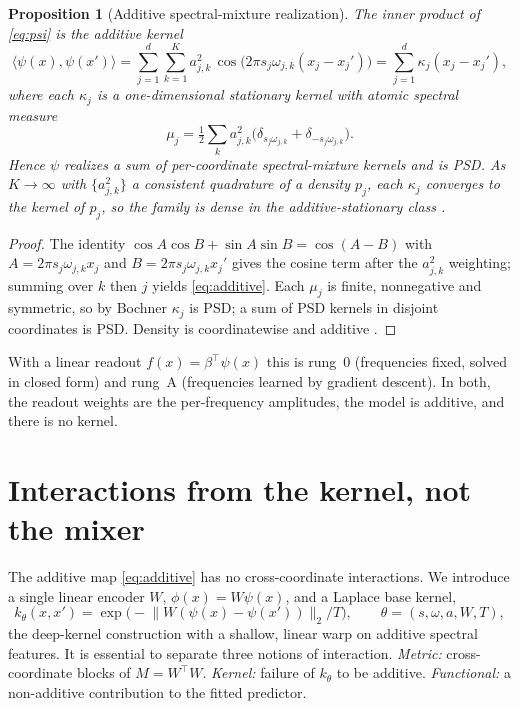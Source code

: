 \documentclass[11pt]{article}
\newtheorem{proposition}{Proposition}
\theoremstyle{definition}
\newcommand{\inner}[2]{\langle #1, #2 \rangle}
\newcommand{\norm}[1]{\lVert #1 \rVert}
\begin{document}
\begin{proposition}[Additive spectral-mixture realization]\label{prop:additive}
The inner product of \eqref{eq:psi} is the additive kernel
\begin{equation}
\inner{\psi(x)}{\psi(x')}=\sum_{j=1}^d\sum_{k=1}^K a_{j,k}^2\,
\cos\!\big(2\pi s_j\omega_{j,k}(x_j-x_j')\big)=\sum_{j=1}^d\kappa_j(x_j-x_j'),
\label{eq:additive}
\end{equation}
where each $\kappa_j$ is a one-dimensional stationary kernel with atomic spectral measure
\begin{equation*}
\mu_j=\tfrac12\sum_k a_{j,k}^2\big(\delta_{s_j\omega_{j,k}}+\delta_{-s_j\omega_{j,k}}\big).
\end{equation*}
Hence $\psi$ realizes a sum of per-coordinate spectral-mixture kernels and is PSD. As $K\to\infty$ with
$\{a_{j,k}^2\}$ a consistent quadrature of a density $p_j$, each $\kappa_j$ converges to the
kernel of $p_j$, so the family is dense in the additive-stationary class
\citep{wilson2013,duvenaud2011}.
\end{proposition}
\begin{proof}
The identity $\cos A\cos B+\sin A\sin B=\cos(A-B)$ with $A=2\pi s_j\omega_{j,k}x_j$ and
$B=2\pi s_j\omega_{j,k}x_j'$ gives the cosine term after the $a_{j,k}^2$ weighting; summing
over $k$ then $j$ yields \eqref{eq:additive}. Each $\mu_j$ is finite, nonnegative and symmetric,
so by Bochner $\kappa_j$ is PSD; a sum of PSD kernels in disjoint coordinates is PSD. Density is
coordinatewise \citep{wilson2013} and additive \citep{duvenaud2011}.
\end{proof}

With a linear readout $f(x)=\beta^\top\psi(x)$ this is rung~0 (frequencies fixed, solved in
closed form) and rung~A (frequencies learned by gradient descent). In both, the readout weights
are the per-frequency amplitudes, the model is additive, and there is no kernel.

\section{Interactions from the kernel, not the mixer}\label{sec:warp}
The additive map \eqref{eq:additive} has no cross-coordinate interactions. We introduce a single
linear encoder $W$, $\phi(x)=W\psi(x)$, and a Laplace base kernel,
\begin{equation}
k_\theta(x,x')=\exp\!\big(-\norm{W(\psi(x)-\psi(x'))}_2/T\big),\qquad \theta=(s,\omega,a,W,T),
\label{eq:kernel}
\end{equation}
the deep-kernel construction \citep{wilson2016} with a shallow, linear warp on additive spectral
features. It is essential to separate three notions of interaction. \emph{Metric:}
cross-coordinate blocks of $M=W^\top W$. \emph{Kernel:} failure of $k_\theta$ to be additive.
\emph{Functional:} a non-additive contribution to the fitted predictor.
\end{document}
